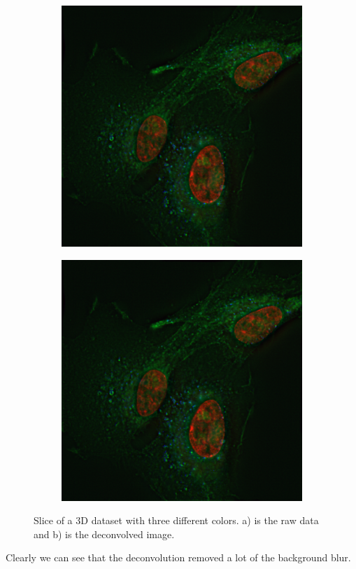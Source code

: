 \documentclass{juliacon}
\begin{document}
        \begin{figure}[h]
            \begin{subfigure}{.25\textwidth}
                \centering
                \includegraphics[width = .95\textwidth]{figures/deconvolved_rgb.png}
            \end{subfigure}%
            \begin{subfigure}{.25\textwidth}
                \centering
                \includegraphics[width = .95\textwidth]{figures/deconvolved_rgb.png}
            \end{subfigure}
            \caption{Slice of a 3D dataset with three different colors. a) is the raw data and b) is the
                    deconvolved image.}
            \label{fig:result_3d}
        \end{figure} 
        Clearly we can see that the deconvolution removed a lot of the background blur.
\end{document}
